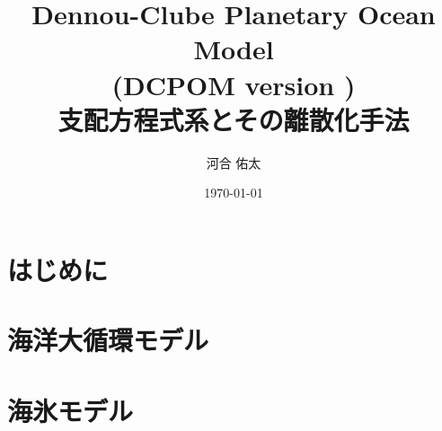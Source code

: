 \documentclass[a4j,12pt,openbib,oneside]{jreport}
\title{{\LARGE Dennou-Clube Planetary Ocean Model \\
              (DCPOM version \version) \\
               支配方程式系とその離散化手法 }}
\author{河合 佑太}
\date{\today}
\begin{document}
\maketitle
\tableofcontents

\chapter{はじめに}


\chapter{海洋大循環モデル}


\chapter{海氷モデル}



\renewcommand{\bibname}{参考文献}

\end{document}
